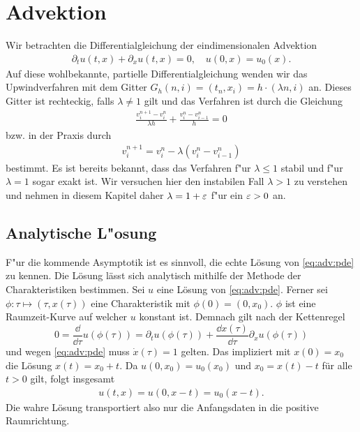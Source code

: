 \section{Advektion}

Wir betrachten die Differentialgleichung der eindimensionalen Advektion
\begin{align}\label{eq:adv:pde}
\partial_t u(t, x) + \partial_x u(t, x) = 0, \quad u(0, x) = u_0(x).
\end{align}
Auf diese wohlbekannte, partielle Differentialgleichung wenden wir das Upwindverfahren mit dem Gitter $G_h(n,i) = (t_n, x_i) = h \cdot (\lambda n, i)$ an.
Dieses Gitter ist rechteckig, falls $\lambda \neq 1$ gilt und das Verfahren ist durch die Gleichung
\begin{align}\label{eq:adv:scheme_rechnung}
\frac {v^{n+1}_i - v^n_i} {\lambda h} + \frac {v^n_i - v^n_{i-1}} h = 0
\end{align}
bzw. in der Praxis durch
\begin{align}\label{eq:adv:scheme}
v^{n+1}_i = v^n_i - \lambda (v^n_i - v^n_{i-1})
\end{align}
bestimmt.
Es ist bereits bekannt, dass das Verfahren f"ur $\lambda \leq 1$ stabil und f"ur $\lambda = 1$ sogar exakt ist.
Wir versuchen hier den instabilen Fall $\lambda > 1$ zu verstehen und nehmen in diesem Kapitel daher $\lambda = 1 + \varepsilon$ f"ur ein $\varepsilon > 0$ an.

\subsection {Analytische L"osung}

F"ur die kommende Asymptotik ist es sinnvoll, die echte Lösung von \eqref{eq:adv:pde} zu kennen.
Die Lösung lässt sich analytisch mithilfe der Methode der Charakteristiken bestimmen.
Sei $u$ eine Lösung von \eqref{eq:adv:pde}.
Ferner sei $\phi\colon \tau \mapsto (\tau, x(\tau))$ eine Charakteristik mit $\phi(0) = (0, x_0)$.
$\phi$ ist eine Raumzeit-Kurve auf welcher $u$ konstant ist.
Demnach gilt nach der Kettenregel
\[ 0 = \frac {\dd}{\dd \tau} u(\phi(\tau)) = \partial_t u(\phi(\tau))  + \frac {\dd x(\tau)} {\dd \tau} \partial_x u(\phi(\tau)) \]
und wegen \eqref{eq:adv:pde} muss $\dot x(\tau) = 1$ gelten.
Das impliziert mit $x(0) = x_0$ die Lösung $x(t) = x_0 + t$.
Da $u(0, x_0) = u_0(x_0)$ und $x_0 = x(t) - t$ für alle $t > 0$ gilt, folgt insgesamt
\begin{align}\label{eq:adv:solution}
u(t, x) = u(0, x - t) = u_0(x - t).
\end{align}
Die wahre Lösung transportiert also nur die Anfangsdaten in die positive Raumrichtung.

